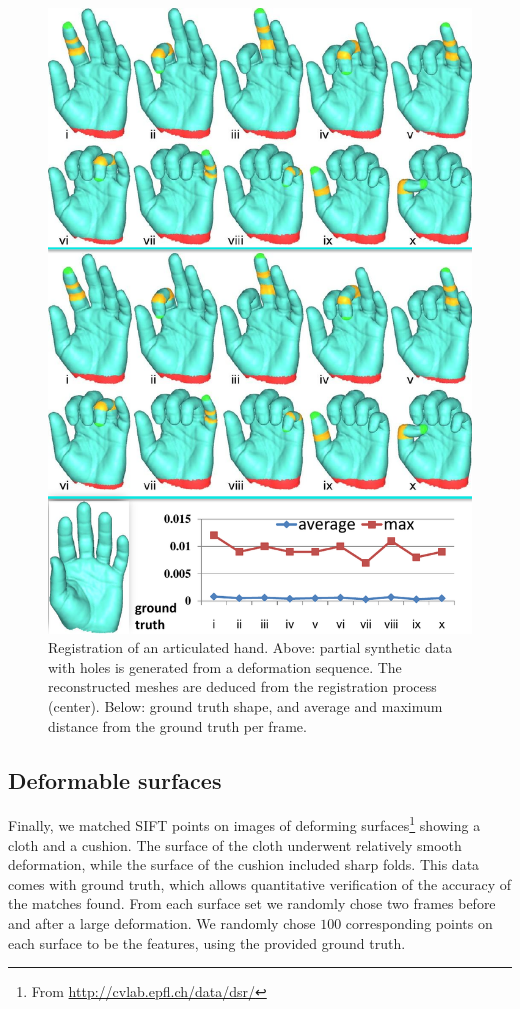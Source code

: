 \begin{figure}[h]
\centering
  \includegraphics[width=0.95\linewidth]{figures/3DHand.pdf}
  \caption{Registration of an articulated hand.
  Above: partial synthetic data with holes is generated from a deformation sequence.
  The reconstructed meshes are deduced from the registration process (center).
  Below: ground truth shape, and average and maximum distance from the ground truth per frame.}
\label{fig:3DHand}
\end{figure}

\subsection{Deformable surfaces}
\label{subsec:2DDeformable}

Finally, we matched SIFT points on images of deforming surfaces\footnote{From \url{http://cvlab.epfl.ch/data/dsr/}} showing a cloth and a cushion.
The surface of the cloth underwent relatively smooth deformation, while the surface of the cushion included sharp folds.
This data comes with ground truth, which allows quantitative verification of the accuracy of the matches found.
From each surface set we randomly chose two frames before and after a large deformation.
We randomly chose $100$ corresponding points on each surface to be the features, using the provided ground truth.

